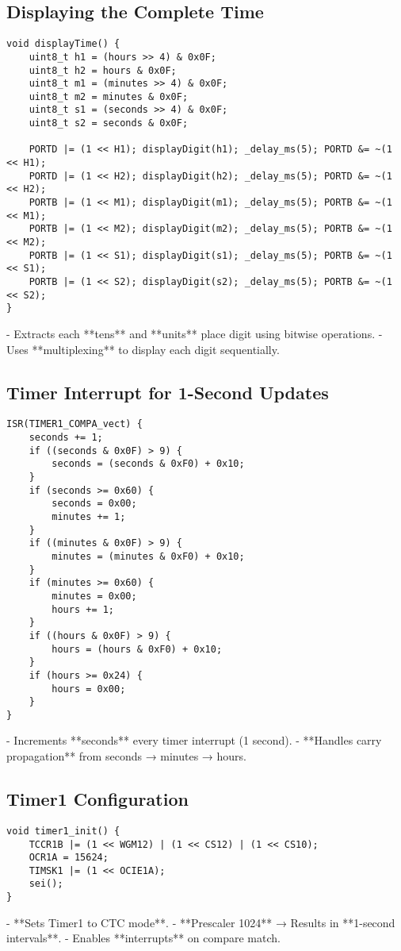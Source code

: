 \subsection*{Displaying the Complete Time}
\begin{lstlisting}
void displayTime() {
    uint8_t h1 = (hours >> 4) & 0x0F;
    uint8_t h2 = hours & 0x0F;
    uint8_t m1 = (minutes >> 4) & 0x0F;
    uint8_t m2 = minutes & 0x0F;
    uint8_t s1 = (seconds >> 4) & 0x0F;
    uint8_t s2 = seconds & 0x0F;

    PORTD |= (1 << H1); displayDigit(h1); _delay_ms(5); PORTD &= ~(1 << H1);
    PORTD |= (1 << H2); displayDigit(h2); _delay_ms(5); PORTD &= ~(1 << H2);
    PORTB |= (1 << M1); displayDigit(m1); _delay_ms(5); PORTB &= ~(1 << M1);
    PORTB |= (1 << M2); displayDigit(m2); _delay_ms(5); PORTB &= ~(1 << M2);
    PORTB |= (1 << S1); displayDigit(s1); _delay_ms(5); PORTB &= ~(1 << S1);
    PORTB |= (1 << S2); displayDigit(s2); _delay_ms(5); PORTB &= ~(1 << S2);
}
\end{lstlisting}
- Extracts each **tens** and **units** place digit using bitwise operations.
- Uses **multiplexing** to display each digit sequentially.

\subsection*{Timer Interrupt for 1-Second Updates}
\begin{lstlisting}
ISR(TIMER1_COMPA_vect) {
    seconds += 1;
    if ((seconds & 0x0F) > 9) { 
        seconds = (seconds & 0xF0) + 0x10;
    }
    if (seconds >= 0x60) {
        seconds = 0x00;
        minutes += 1;
    }
    if ((minutes & 0x0F) > 9) { 
        minutes = (minutes & 0xF0) + 0x10;
    }
    if (minutes >= 0x60) {
        minutes = 0x00;
        hours += 1;
    }
    if ((hours & 0x0F) > 9) { 
        hours = (hours & 0xF0) + 0x10;
    }
    if (hours >= 0x24) {
        hours = 0x00;
    }
}
\end{lstlisting}
- Increments **seconds** every timer interrupt (1 second).
- **Handles carry propagation** from seconds → minutes → hours.

\subsection*{Timer1 Configuration}
\begin{lstlisting}
void timer1_init() {
    TCCR1B |= (1 << WGM12) | (1 << CS12) | (1 << CS10);
    OCR1A = 15624;
    TIMSK1 |= (1 << OCIE1A);
    sei();
}
\end{lstlisting}
- **Sets Timer1 to CTC mode**.
- **Prescaler 1024** → Results in **1-second intervals**.
- Enables **interrupts** on compare match.


